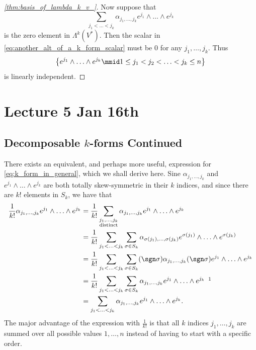 \documentclass[notoc,notitlepage]{tufte-book}
\begin{document}
\begin{proof}[\cref{thm:basis_of_lambda_k_v_}]
  Now suppose that
  \begin{equation*}
    \sum_{j_1 < \hdots < j_k} \alpha_{j_1, \ldots, j_k} e^{j_1} \land \hdots \land e^{j_k}
  \end{equation*}
  is the zero element in $\Lambda^k(V^*)$. Then the scalar in \cref{eq:another_alt_of_a_k_form_scalar} must be $0$ for any $j_1, \ldots, j_k$. Thus
  \begin{equation*}
    \left\{ e^{j_1} \land \hdots \land e^{j_k} \mmid 1 \leq j_1 < j_2 < \hdots < j_k \leq n \right\}
  \end{equation*}
  is linearly independent.
\end{proof}



\chapter{Lecture 5 Jan 16th}%
\label{chp:lecture_5_jan_16th}

\section{Decomposable \texorpdfstring{$k$}{k}-forms Continued}%
\label{sec:decomposable_k_forms_continued}

There exists an equivalent, and perhaps more useful, expression for \cref{eq:k_form_in_general},
which we shall derive here. Sine $\alpha_{j_1, \ldots, j_k}$ and
$e^{j_1} \land \hdots \land e^{j_k}$ are both totally skew-symmetric in their $k$ indices,
and since there are $k!$ elements in $S_k$, we have that
\begin{align*}
  \frac{1}{k!} \alpha_{j_1, \ldots, j_k} e^{j_1} \land \hdots \land e^{j_k}
  &= \frac{1}{k!} \sum_{\substack{j_1, \ldots, j_k \\ \text{distinct}}}
    \alpha_{j_1, \ldots, j_k} e^{j_1} \land \hdots \land e^{j_k} \\
  &= \frac{1}{k!} \sum_{j_1 < \hdots < j_k} \sum_{\sigma \in S_k}
    \alpha_{\sigma(j_1), \ldots, \sigma(j_k)} e^{\sigma(j_1)} \land \hdots \land e^{\sigma(j_k)} \\
  &= \frac{1}{k!} \sum_{j_1 < \hdots < j_k} \sum_{\sigma \in S_k} (\sgn \sigma)
    \alpha_{j_1, \ldots, j_k} (\sgn \sigma) e^{j_1} \land \hdots \land e^{j_k} \\
  &= \frac{1}{k!} \sum_{j_1 < \hdots < j_k} \sum_{\sigma \in S_k}
    \alpha_{j_1, \ldots, j_k} e^{j_1} \land \hdots \land e^{j_k} \enspace \footnotemark \\
  &= \sum_{j_1 < \hdots < j_k} \alpha_{j_1, \ldots, j_k} e^{j_1} \land \hdots \land e^{j_k}.
\end{align*}
The major advantage of the expression with $\frac{1}{k!}$ is that all $k$ indices
$j_1, \ldots, j_k$ are summed over all possible values $1, \ldots, n$ instead of
having to start with a specific order.
\end{document}
